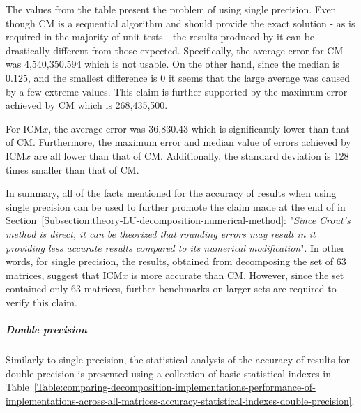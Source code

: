 The values from the table present the problem of using single precision. Even though CM is a sequential algorithm and should provide the exact solution - as is required in the majority of unit tests - the results produced by it can be drastically different from those expected. Specifically, the average error for CM was 4,540,350.594 which is not usable. On the other hand, since the median is 0.125, and the smallest difference is 0 it seems that the large average was caused by a few extreme values. This claim is further supported by the maximum error achieved by CM which is 268,435,500.
\par For ICM$ x $, the average error was 36,830.43 which is significantly lower than that of CM. Furthermore, the maximum error and median value of errors achieved by ICM$ x $ are all lower than that of CM. Additionally, the standard deviation is 128 times smaller than that of CM.
\par In summary, all of the facts mentioned for the accuracy of results when using single precision can be used to further promote the claim made at the end of \textit{} in Section~\ref{Subsection:theory-LU-decomposition-numerical-method}: "\textit{Since Crout's method is direct, it can be theorized that rounding errors may result in it providing less accurate results compared to its numerical modification}". In other words, for single precision, the results, obtained from decomposing the set of 63 matrices, suggest that ICM$ x $ is more accurate than CM. However, since the set contained only 63 matrices, further benchmarks on larger sets are required to verify this claim.

\subparagraph{Double precision} Similarly to single precision, the statistical analysis of the accuracy of results for double precision is presented using a collection of basic statistical indexes in Table~\ref{Table:comparing-decomposition-implementations-performance-of-implementations-across-all-matrices-accuracy-statistical-indexes-double-precision}.

